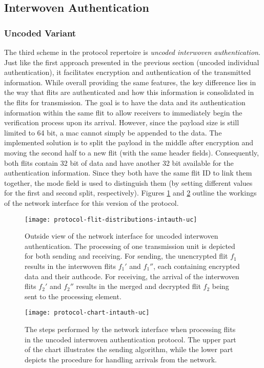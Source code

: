 \subsection{Interwoven Authentication}\label{subsec:intauth}
\subsubsection{Uncoded Variant}
The third scheme in the protocol repertoire is \textit{uncoded interwoven authentication}. Just like the first approach presented in the previous
section (uncoded individual authentication), it facilitates encryption and authentication of the transmitted information. While overall providing the
same features, the key difference lies in the way that flits are authenticated and how this information is consolidated in the flits for transmission.
The goal is to have the data and its authentication information within the same flit to allow receivers to immediately begin the verification process
upon its arrival. However, since the payload size is still limited to 64 bit, a \gls{mac} cannot simply be appended to the data. The implemented
solution is to split the payload in the middle after encryption and moving the second half to a new flit (with the same header fields). Consequently,
both flits contain 32 bit of data and have another 32 bit available for the authentication information. Since they both have the same flit ID to link
them together, the mode field is used to distinguish them (by setting different values for the first and second split, respectively). Figures
\ref{fig:protflitdistintauthuc} and \ref{fig:protchartintauthuc} outline the workings of the network interface for this version of the protocol.

\begin{figure}
    \centering
    \texttt{[image: protocol-flit-distributions-intauth-uc]}
    \caption[Uncoded int. auth., outside view]{Outside view of the network interface for uncoded interwoven authentication. The processing of one
    transmission unit is depicted for both sending and receiving. For sending, the unencrypted flit $f_1$ results in the interwoven flits $f_1'$ and
    $f_1''$, each containing encrypted data and their authcode. For receiving, the arrival of the interwoven flits $f_2'$ and $f_2''$ results in the
    merged and decrypted flit $f_2$ being sent to the processing element.}
    \label{fig:protflitdistintauthuc}
\end{figure}

\begin{figure}
    \centering
    \texttt{[image: protocol-chart-intauth-uc]}
    \caption[Uncoded int. auth., detailed procedure]{The steps performed by the network interface when processing flits in the uncoded interwoven
    authentication protocol. The upper part of the chart illustrates the sending algorithm, while the lower part depicts the procedure for handling
    arrivals from the network.}
    \label{fig:protchartintauthuc}
\end{figure}

